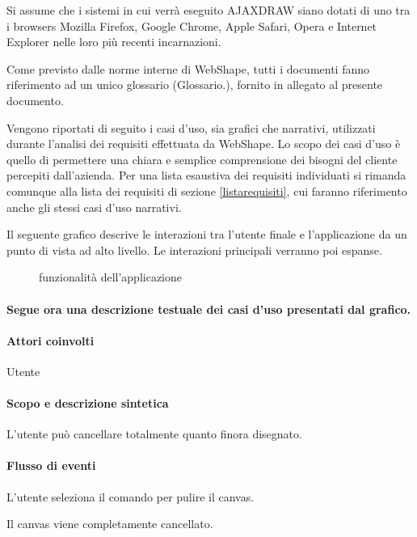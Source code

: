 Si assume che i sistemi in cui verr\`a eseguito AJAXDRAW siano dotati di uno tra i browsers Mozilla Firefox, Google Chrome, Apple Safari, Opera e Internet Explorer nelle loro pi\`u recenti incarnazioni.

Come previsto dalle norme interne di WebShape, tutti i documenti fanno riferimento ad un unico glossario (Glossario.), fornito in allegato al presente documento.

Vengono riportati di seguito i casi d'uso, sia grafici che narrativi, utilizzati durante l'analisi dei requisiti effettuata da WebShape. Lo scopo dei casi d'uso \`e quello di permettere una chiara e semplice comprensione dei bisogni del cliente percepiti dall'azienda. Per una lista esaustiva dei requisiti individuati si rimanda comunque alla lista dei requisiti di sezione \ref{listarequisiti}, cui faranno riferimento anche gli stessi casi d'uso narrativi.

Il seguente grafico descrive le interazioni tra l'utente finale e l'applicazione da un punto di vista ad alto livello. Le interazioni principali verranno poi espanse.
\begin{figure}[!ht]
\centering
\vspace{20pt} 
\caption{funzionalit\`a dell'applicazione}
\end{figure}

\paragraph{Segue ora una descrizione testuale dei casi d'uso presentati dal grafico.}

\paragraph{Attori coinvolti} Utente
\paragraph{Scopo e descrizione sintetica}
L'utente pu\`o cancellare totalmente quanto finora disegnato.
\paragraph{Flusso di eventi}
\begin{elenconumerato}[\textbf{}]{\subsubsecindent}
\item L'utente seleziona il comando per pulire il canvas. 
\item Il canvas viene completamente cancellato.
\end{elenconumerato}

